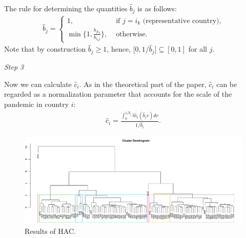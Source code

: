 \documentclass[a4paper,11pt]{article}
\numberwithin{equation}{section}
\begin{document}
The rule for determining the quantities $\hat{b}_j$ is as follows:
\begin{align}\label{eq:b_hat}
\hat{b}_{j} = \begin{cases}
1, &\text{ if } j = i_k \text{ (representative country),}\\
\min \Big\{1, \frac{b_{j i_{k}}}{b_{i_k j}}\Big\},  &\text{ otherwise.}
\end{cases}
\end{align}
Note that by construction $\hat{b}_j \geq 1$, hence, $\big[ 0, 1/\hat{b}_j \big] \subseteq [0, 1]$ for all $j$.

\textit{Step 3}

Now we can calculate $\hat{c}_i$. As in the theoretical part of the paper, $\hat{c}_i$ can be regarded as a normalization parameter that accounts for the scale of the pandemic in country $i$:
\begin{align}\label{eq:c_hat}
\hat{c}_{i} = \frac{\int_0^{1/\hat{b}_i} \hat{m}_i(\hat{b}_i v) dv}{1/\hat{b}_i}.
\end{align}



\begin{figure}[t!]
\begin{minipage}[t]{0.98\textwidth}
\includegraphics[width=\textwidth]{plots/dendrogram}
\caption{Results of HAC.}\label{fig:dend}
\end{minipage}
\end{figure}
\end{document}
